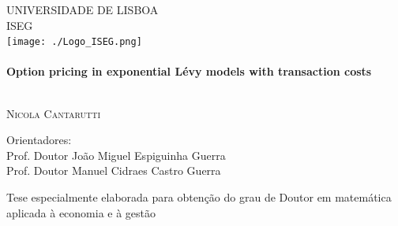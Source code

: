 \begin{titlepage}
\begin{center}



\textsc{\Large UNIVERSIDADE DE LISBOA}\\[0.25cm]
\textsc{\Large ISEG}\\[0.7cm]

\texttt{[image: ./Logo\_ISEG.png]}~\\[0.2cm]

\HRule \\[0.4cm]
{ \huge \bfseries Option pricing in exponential Lévy models with transaction costs \\[0.3em] }

\HRule \\[1.5cm]


\textsc{\LARGE Nicola Cantarutti}\\[0.5em]


\noindent
\begin{flushleft}
Orientadores:\\[0.2cm]
   Prof. Doutor João Miguel Espiguinha Guerra\\
   Prof. Doutor Manuel Cidraes Castro Guerra\\
\end{flushleft}
\vspace{1.0em}


{Tese especialmente elaborada para obtenção do grau de Doutor em matemática aplicada à economia e à gestão}\\[0.8em]


\end{center}
\end{titlepage}
